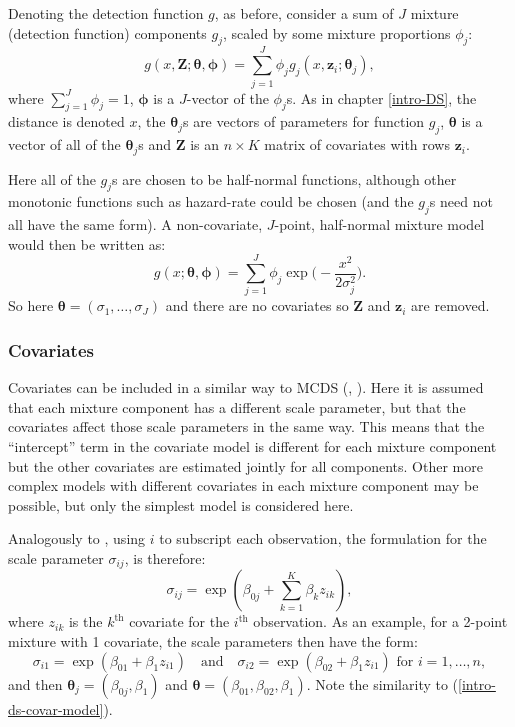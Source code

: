 Denoting the detection function $g$, as before, consider a sum of $J$ mixture (detection function) components $g_j$, scaled by some mixture proportions $\phi_j$:
\begin{equation}
g(x,\mathbf{Z}; \bm{\theta}, \bm{\phi}) = \sum_{j=1}^J \phi_j g_j(x,\mathbf{z}_i; \bm{\theta}_j),
\label{mix-detfct}
\end{equation}
where $\sum_{j=1}^J \phi_j = 1$, $\bm{\phi}$ is a $J$-vector of the $\phi_j$s. As in chapter \ref{intro-DS}, the distance is denoted $x$, the $\bm{\theta}_j$s are vectors of parameters for function $g_j$, $\bm{\theta}$ is a vector of all of the $\bm{\theta}_j$s and $\mathbf{Z}$ is an $n\times K$ matrix of covariates with rows $\mathbf{z}_i$.

Here all of the $g_j$s are chosen to be half-normal functions, although other monotonic functions such as hazard-rate could be chosen (and the $g_j$s need not all have the same form). A non-covariate, $J$-point, half-normal mixture model would then be written as:
\begin{equation*}
g(x; \bm{\theta}, \bm{\phi}) = \sum_{j=1}^J \phi_j \exp \Big( - \frac{x^2}{2\sigma_j^2} \Big).
\end{equation*}
So here $\bm{\theta} = (\sigma_1, \ldots, \sigma_J)$ and there are no covariates so $\mathbf{Z}$ and $\mathbf{z}_i$ are removed.

\subsubsection{Covariates}

Covariates can be included in a similar way to MCDS (, \cite[Chapter 3]{ADS}). Here it is assumed that each mixture component has a different scale parameter, but that the covariates affect those scale parameters in the same way. This means that the ``intercept'' term in the covariate model is different for each mixture component but the other covariates are estimated jointly for all components. Other more complex models with different covariates in each mixture component may be possible, but only the simplest model is considered here.

Analogously to , using $i$ to subscript each observation, the formulation for the scale parameter $\sigma_{ij}$, is therefore:
\begin{equation*}
\sigma_{ij} = \exp( \beta_{0j} + \sum_{k=1}^K \beta_k z_{ik}),
\end{equation*}
where $z_{ik}$ is the $k^\text{th}$ covariate for the $i^\text{th}$ observation. As an example, for a 2-point mixture with 1 covariate, the scale parameters then have the form:
\begin{equation*}
\sigma_{i1} = \exp( \beta_{01} + \beta_1 z_{i1}) \quad \text{and} \quad \sigma_{i2} = \exp( \beta_{02} + \beta_1 z_{i1}) \text{ for } i=1,\ldots,n,
\end{equation*}
and then $\bm{\theta}_j = (\beta_{0j}, \beta_1)$ and $\bm{\theta} = (\beta_{01}, \beta_{02}, \beta_1)$. Note the similarity to (\ref{intro-ds-covar-model}).

